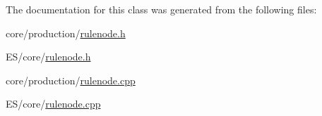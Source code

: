 The documentation for this class was generated from the following files:\begin{DoxyCompactItemize}
\item 
core/production/\hyperlink{core_2production_2rulenode_8h}{rulenode.h}\item 
ES/core/\hyperlink{_e_s_2core_2rulenode_8h}{rulenode.h}\item 
core/production/\hyperlink{core_2production_2rulenode_8cpp}{rulenode.cpp}\item 
ES/core/\hyperlink{_e_s_2core_2rulenode_8cpp}{rulenode.cpp}\end{DoxyCompactItemize}
